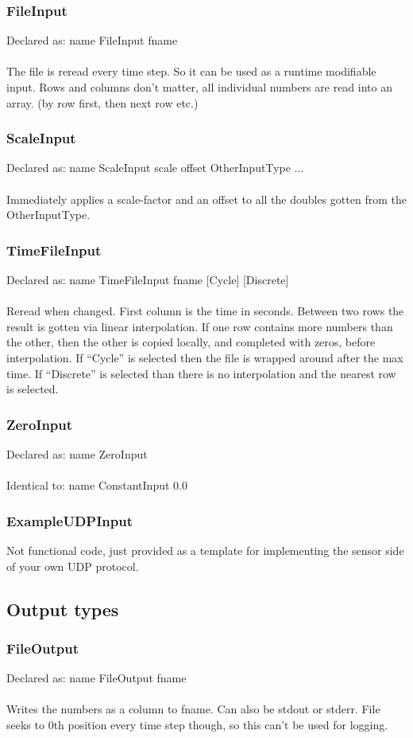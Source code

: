 \documentclass[a4paper]{article}
\begin{document}
\subsubsection{FileInput}
Declared as: name FileInput fname\\\\
The file is reread every time step. So it can be used as a runtime modifiable input.
Rows and columns don't matter, all individual numbers are read into an array. (by row first, then next row etc.)
\subsubsection{ScaleInput}
Declared as: name ScaleInput scale offset OtherInputType $\ldots$\\\\
Immediately applies a scale-factor and an offset to all the doubles gotten from the OtherInputType.
\subsubsection{TimeFileInput}
Declared as: name TimeFileInput fname [Cycle] [Discrete]\\\\
Reread when changed. First column is the time in seconds. Between two rows the result is gotten via linear interpolation. If one row contains more numbers than the other, then the other is copied locally, and completed with zeros, before interpolation. If ``Cycle'' is selected then the file is wrapped around after the max time. If ``Discrete'' is selected than there is no interpolation and the nearest row is selected.
\subsubsection{ZeroInput}
Declared as: name ZeroInput\\\\
Identical to: name ConstantInput 0.0
\subsubsection{ExampleUDPInput}
Not functional code, just provided as a template for implementing the sensor side of your own UDP protocol.
\subsection{Output types}
\subsubsection{FileOutput}
Declared as: name FileOutput fname\\\\
Writes the numbers as a column to fname. Can also be stdout or stderr.
File seeks to 0th position every time step though, so this can't be used for logging.
\end{document}
